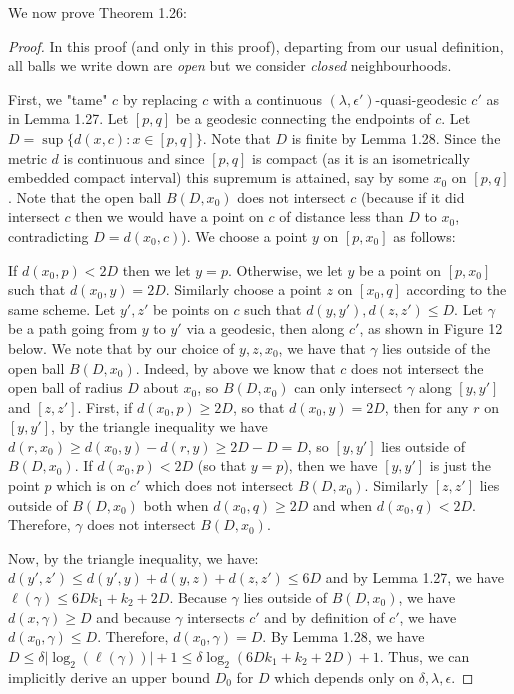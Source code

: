 \documentclass[12pt]{article}
\newcommand{\vs}{\vskip10pt}
\begin{document}
	\vs 
	
	We now prove Theorem 1.26: 
	
	\begin{proof}
		
		In this proof (and only in this proof), departing from our usual definition, all balls we write down are \textit{open} but we consider \textit{closed} neighbourhoods. 
		
		\vs
		
		First, we "tame" $c$ by replacing $c$ with a continuous $(\lambda, \epsilon')$-quasi-geodesic $c'$ as in Lemma 1.27. Let $[p,q]$ be a geodesic connecting the endpoints of $c$. Let $D = \sup \{d(x,c): x \in [p,q]\}$. Note that $D$ is finite by Lemma 1.28. Since the metric $d$ is continuous and since $[p,q]$ is compact (as it is an isometrically embedded compact interval) this supremum is attained, say by some $x_0$ on $[p,q]$. Note that the open ball $B(D, x_0)$ does not intersect $c$ (because if it did intersect $c$ then we would have a point on $c$ of distance less than $D$ to $x_0$, contradicting $D = d(x_0,c)$). We choose a point $y$ on $[p,x_0]$ as follows: 
		
		\vs 
		
		If $d(x_0, p) < 2D$ then we let $y = p$. Otherwise, we let $y$ be a point on $[p, x_0]$ such that $d(x_0, y) = 2D$. Similarly choose a point $z$ on $[x_0, q]$ according to the same scheme. Let $y', z'$ be points on $c$ such that $d(y, y'), d(z, z') \leq D$. Let $\gamma$ be a path going from $y$ to $y'$ via a geodesic, then along $c'$, as shown in Figure 12 below. We note that by our choice of $y,z,x_0$, we have that $\gamma$ lies outside of the open ball $B(D, x_0)$. Indeed, by above we know that $c$ does not intersect the open ball of radius $D$ about $x_0$, so $B(D, x_0)$ can only intersect $\gamma$ along $[y, y']$ and $[z, z']$. First, if $d(x_0, p) \geq 2D$, so that $d(x_0, y) = 2D$, then for any $r$ on $[y, y']$, by the triangle inequality we have $d(r, x_0) \geq d(x_0, y) - d(r,y) \geq 2D - D = D$, so $[y, y']$ lies outside of $B(D, x_0)$. If $d(x_0, p) < 2D$ (so that $y = p$), then we have $[y,y']$ is just the point $p$ which is on $c'$ which does not intersect $B(D, x_0)$. Similarly $[z,z']$ lies outside of $B(D, x_0)$ both when $d(x_0, q) \geq 2D$ and when $d(x_0, q) < 2D$. Therefore, $\gamma$ does not intersect $B(D, x_0)$. 
		
		\vs
		
		Now, by the triangle inequality, we have: $d(y', z') \leq d(y', y) + d(y,z) + d(z, z') \leq 6 D$ and by Lemma 1.27, we have $\ell(\gamma) \leq 6Dk_1 + k_2 + 2D$. Because $\gamma$ lies outside of $B(D, x_0)$, we have $d(x, \gamma) \geq D$ and because $\gamma$ intersects $c'$ and by definition of $c'$, we have $d(x_0, \gamma) \leq D$. Therefore, $d(x_0, \gamma) = D$. By Lemma 1.28, we have $D \leq \delta \vert \log_2 (\ell(\gamma)) \vert + 1 \leq \delta \log_2 (6 D k_1 + k_2 + 2D) + 1$. Thus, we can implicitly derive an upper bound $D_0$ for $D$ which depends only on $\delta, \lambda, \epsilon$. 
		

\end{proof}
\end{document}
